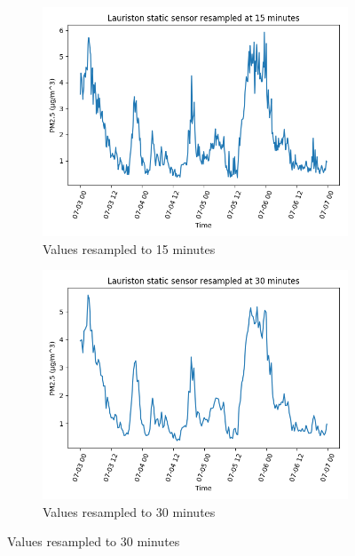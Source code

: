 \begin{figure}
\begin{subfigure}[t]{0.5\textwidth}
\centering
\includegraphics[width=\textwidth]{images/static_sensor_lauriston_resampled_15_min.png}
\caption{Values resampled to 15 minutes}
\label{fig:resample_15}
\end{subfigure}%
%
\hfill
%
\begin{subfigure}[t]{0.5\textwidth}
\centering
\includegraphics[width=\textwidth]{images/static_sensor_lauriston_resampled_30_min.png}
\caption{Values resampled to 30 minutes}
\label{fig:resample_30}
\end{subfigure}

\bigskip 


\end{figure}
